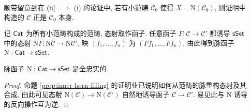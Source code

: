 顺带留意到在 (ii) $\implies$ (i) 的论证中, 若有小范畴 $\mathcal{C}_0$ 使得 $X = \mathrm{N}(\mathcal{C}_0)$, 则证明中构造的 $\mathcal{C}$ 正是 $\mathcal{C}_0$ 本身.

记 $\mathsf{Cat}$ 为所有小范畴构成的范畴, 态射取作函子. 任意函子 $F: \mathcal{C} \to \mathcal{C}'$ 都诱导 $\mathsf{sSet}$ 中的态射 $\mathrm{N}F: \mathrm{N}\mathcal{C} \to \mathrm{N}\mathcal{C}'$, 映 $(f_1, \ldots, f_n)$ 为 $(Ff_1, \ldots, Ff_n)$, 由此得到脉函子 $\mathrm{N}: \mathsf{Cat} \to \mathsf{sSet}$.

\begin{proposition}\label{prop:nerve-ff}
	脉函子 $\mathrm{N}: \mathsf{Cat} \to \mathsf{sSet}$ 是全忠实的.
\end{proposition}
\begin{proof}
	命题 \ref{prop:inner-horn-filling} 的证明业已说明如何从范畴的脉重构态射及其合成, 由此可见态射 $\mathrm{N}(\mathcal{C}) \to \mathrm{N}(\mathcal{C}')$ 自然地诱导函子 $\mathcal{C} \to \mathcal{C}'$. 易见此与 $\mathrm{N}$ 诱导的反向操作互为逆.
\end{proof}

